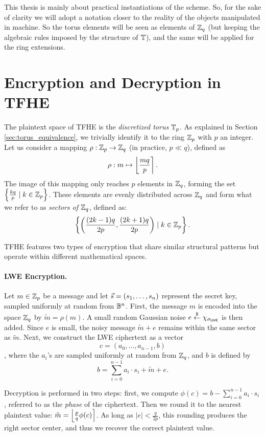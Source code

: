 This thesis is mainly about practical instantiations of the scheme. So, for the sake of clarity we will adopt a notation closer to the reality of the objects manipulated in machine. So the torus elements will be seen as elements of $\mathbb{Z}_q$ (but keeping the algebraic rules imposed by the structure of $\mathbb{T}$), and the same will be applied for the ring extensions. 



\section{Encryption and Decryption in TFHE}


The plaintext space of TFHE is the \textit{discretized torus} $\mathbb{T}_p$. As explained in Section \ref{sec:torus_equivalence}, we trivially identify it to the ring $\mathbb{Z}_p$ with $p$ an integer. Let us consider a mapping $\rho: \mathbb{Z}_p \rightarrow \mathbb{Z}_q$ (in practice, $p \ll q$), defined as \[
\rho: m  \mapsto \left \lfloor \frac{m q} {p} \right \rceil.
\]
The image of this mapping only reaches $p$ elements in $\mathbb{Z}_q$, forming the set $\left \{ \frac {k q}{p} \mid k \in \mathbb{Z}_p \right \}$. These elements are evenly distributed across $\mathbb{Z}_q$ and form what we refer to as \emph{sectors of $\mathbb{Z}_q$}, defined as: \[
\left \{ \left ( \frac{(2 k - 1)q}{2p}, \frac{(2k + 1)q}{2p} \right ) \mid k \in \mathbb{Z}_p \right \}.
\]

TFHE features two types of encryption that share similar structural patterns but operate within different mathematical spaces.


\paragraph{LWE Encryption.} Let $m \in \mathbb{Z}_p$ be a message and let $\vec s=(s_1, \dots, s_n)$ represent the secret key, sampled uniformly at random from $\mathbb{B}^n$. First, the message $m$ is encoded into the space $\mathbb{Z}_q$ by $\tilde m = \rho(m)$. A small random Gaussian noise $e \overset{\$}{\leftarrow} \chi_{\sigma_{\textsf{LWE}}}$ is then added. Since $e$ is small, the noisy message $\tilde m + e$ remains within the same sector as $\tilde m$. Next, we construct the LWE ciphertext as a vector \[c = (a_0, \dots, a_{n-1}, b)\], where the $a_i$'s are sampled uniformly at random from $\mathbb{Z}_q$, and $b$ is defined by \[b=\sum_{i=0}^{n-1} a_i \cdot s_i + \tilde m + e.\]

Decryption is performed in two steps: first, we compute $\phi(c) = b - \sum_{i=0}^{n - 1} a_i \cdot s_i$, referred to as the \emph{phase} of the ciphertext. Then we round it to the nearest plaintext value: $\tilde m = \left \lfloor \frac p q \phi(c) \right \rceil$. As long as $|e| < \frac{q}{2p}$, this rounding produces the right sector center, and thus we recover the correct plaintext value.

